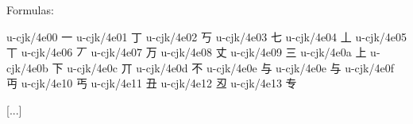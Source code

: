 
\FPmul{}%
\FPmul{}\begin{multicols}{2}Formulas:\mktsShowpar\par
\begingroup\mktsObeyAllLines\mktsStyleCode{}u-cjk/4e00	{\cjk{}一}	
u-cjk/4e01	{\cjk{}丁}	
u-cjk/4e02	{\cjk{}丂}	
u-cjk/4e03	{\cjk{}七}	
u-cjk/4e04	{\cjk{}丄}	
u-cjk/4e05	{\cjk{}丅}	
u-cjk/4e06	{\cjk{}丆}	
u-cjk/4e07	{\cjk{}万}	
u-cjk/4e08	{\cjk{}丈}	u-cjk/4e09	{\cjk{}三}	
u-cjk/4e0a	{\cjk{}上}	
u-cjk/4e0b	{\cjk{}下}	
u-cjk/4e0c	{\cjk{}丌}	u-cjk/4e0d	{\cjk{}不}	
u-cjk/4e0e	{\cjk{}与}	
u-cjk/4e0e	{\cjk{}与}	
u-cjk/4e0f	{\cjk{}丏}	u-cjk/4e10	{\cjk{}丐}	
u-cjk/4e11	{\cjk{}丑}	
u-cjk/4e12	{\cjk{}丒}	
u-cjk/4e13	{\cjk{}专}	

[...]


\end{multicols}
